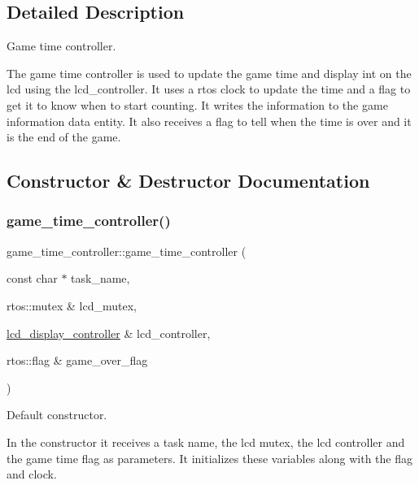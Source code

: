 \subsection{Detailed Description}
Game time controller. 

The game time controller is used to update the game time and display int on the lcd using the lcd\+\_\+controller. It uses a rtos clock to update the time and a flag to get it to know when to start counting. It writes the information to the game information data entity. It also receives a flag to tell when the time is over and it is the end of the game. 

\subsection{Constructor \& Destructor Documentation}
\hypertarget{classgame__time__controller_ad2a906f75a90ca5c906aeb8093ac579b}{}\label{classgame__time__controller_ad2a906f75a90ca5c906aeb8093ac579b} 
\subsubsection{\texorpdfstring{game\+\_\+time\+\_\+controller()}{game\_time\_controller()}}
{\footnotesize\ttfamily game\+\_\+time\+\_\+controller\+::game\+\_\+time\+\_\+controller (\begin{DoxyParamCaption}\item[{const char $\ast$}]{task\+\_\+name,  }\item[{rtos\+::mutex \&}]{lcd\+\_\+mutex,  }\item[{\hyperlink{classlcd__display__controller}{lcd\+\_\+display\+\_\+controller} \&}]{lcd\+\_\+controller,  }\item[{rtos\+::flag \&}]{game\+\_\+over\+\_\+flag }\end{DoxyParamCaption})\hspace{0.3cm}{\ttfamily [inline]}}



Default constructor. 

In the constructor it receives a task name, the lcd mutex, the lcd controller and the game time flag as parameters. It initializes these variables along with the flag and clock. 

